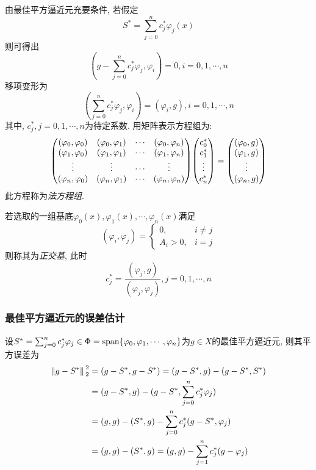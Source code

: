 由最佳平方逼近元充要条件, 若假定
\begin{equation*}
    S^*=\sum_{j=0}^nc_j^*\varphi_j(x)
\end{equation*}
则可得出
\begin{equation*}
    \left(g-\sum_{j=0}^nc_j^*\varphi_j,\varphi_i\right)=0, i=0,1,\cdots,n
\end{equation*}
移项变形为
\begin{equation*}
    \left(\sum_{j=0}^nc_j^*\varphi_j,\varphi_i\right)=(\varphi_i,g), i=0,1,\cdots,n
\end{equation*}
其中, $c_j^*,j=0,1,\cdots,n$为待定系数. 用矩阵表示方程组为:
\begin{equation*}
    \mqty(
        (\varphi_0,\varphi_0)&(\varphi_0,\varphi_1)&\cdots&(\varphi_0,\varphi_n)\\
        (\varphi_1,\varphi_0)&(\varphi_1,\varphi_1)&\cdots&(\varphi_1,\varphi_n)\\
        \vdots&\vdots&\cdots&\vdots\\
        (\varphi_n,\varphi_0)&(\varphi_n,\varphi_1)&\cdots&(\varphi_n,\varphi_n)
    )\mqty(
        c_0^*\\c_1^*\\\vdots\\c_n^*
    )=\mqty(
        (\varphi_0,g)\\(\varphi_1,g)\\\vdots\\(\varphi_n,g)
    )
\end{equation*}
此方程称为\emph{法方程组}.

若选取的一组基底${\varphi_0(x),\varphi_1(x),\cdots,\varphi_n(x)}$满足
\begin{equation*}
    (\varphi_i,\varphi_j)=\begin{cases}
        0,&i\ne j\\
        A_i>0,&i=j
    \end{cases}
\end{equation*}
则称其为\emph{正交基}, 此时
\begin{equation*}
    c_j^*=\frac{(\varphi_j,g)}{(\varphi_j,\varphi_j)}, j=0,1,\cdots,n
\end{equation*}

\subsubsection{最佳平方逼近元的误差估计}

设$S^*=\sum_{j=0}^nc_j^*\varphi_j\in\Phi=\text{span}\{\varphi_0,\varphi_1,\cdots,\varphi_n\}$为$g\in X$的最佳平方逼近元, 则其平方误差为
\begin{align*}
    \norm*{g-S^*}_2^2&=(g-S^*,g-S^*)=(g-S^*,g)-(g-S^*,S^*)\\
    &=(g-S^*,g)-(g-S^*,\sum_{j=0}^nc_j^*\varphi_j)\\
    &=(g,g)-(S^*,g)-\sum_{j=0}^nc_j^*(g-S^*,\varphi_j)\\
    &=(g,g)-(S^*,g)=(g,g)-\sum_{j=1}^nc_j^*(g-\varphi_j)
\end{align*}

